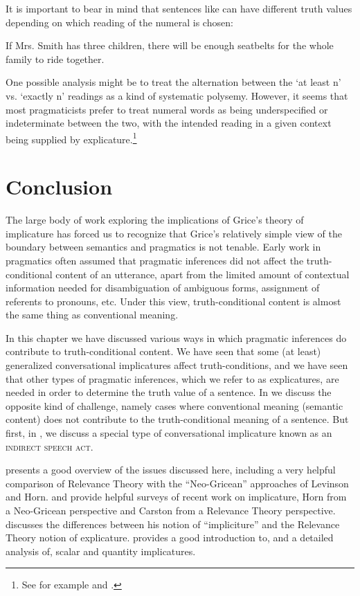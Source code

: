 It is important to bear in mind that sentences like  can have different truth values depending on which reading of the numeral is chosen:


\ea \label{ex:9.34}
If Mrs. Smith has three children, there will be enough seatbelts for the whole family to ride together.
\z


One possible analysis might be to treat the alternation between the ‘at least n’ vs. ‘exactly n’ readings as a kind of systematic polysemy. However, it seems that most pragmaticists prefer to treat numeral words as being underspecified or indeterminate between the two, with the intended reading in a given context being supplied by explicature.\footnote{See for example \citet{Horn1992} and \citet{Carston1998}.}


\section{Conclusion}\label{sec:9.5}

The large body of work exploring the implications of Grice’s theory of implicature has forced us to recognize that Grice’s relatively simple view of the boundary between semantics and pragmatics is not tenable. Early work in pragmatics often assumed that pragmatic inferences did not affect the truth-conditional content of an utterance, apart from the limited amount of contextual information needed for disambiguation of ambiguous forms, assignment of referents to pronouns, etc. Under this view, truth-conditional content is almost the same thing as conventional meaning.



In this chapter we have discussed various ways in which pragmatic inferences do contribute to truth-conditional content. We have seen that some (at least) generalized conversational implicatures affect truth-conditions, and we have seen that other types of pragmatic inferences, which we refer to as explicatures, are needed in order to determine the truth value of a sentence. In  we discuss the opposite kind of challenge, namely cases where conventional meaning (semantic content) does not contribute to the truth-conditional meaning of a sentence. But first, in , we discuss a special type of conversational implicature known as an \textsc{indirect speech act}.



\furtherreading



\citet[ch. 3]{Birner2012} presents a good overview of the issues discussed here, including a very helpful comparison of Relevance Theory with the “Neo-Gricean” approaches of Levinson and Horn. \citet{Horn2004} and \citet{Carston2004} provide helpful surveys of recent work on implicature, Horn from a Neo-Gricean perspective and Carston from a Relevance Theory perspective. \citet{Bach2010} discusses the differences between his notion of “impliciture” and the Relevance Theory notion of explicature. \citet{Geurts2011} provides a good introduction to, and a detailed analysis of, scalar and quantity implicatures.


